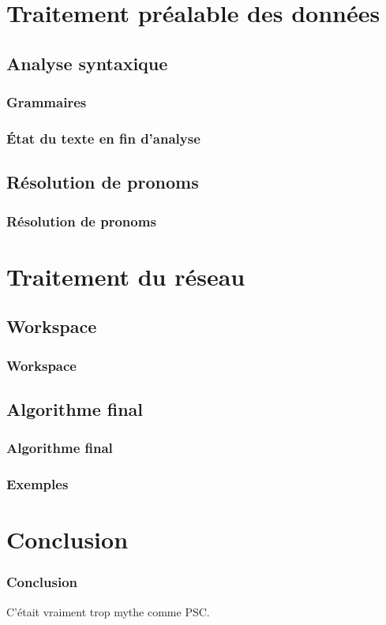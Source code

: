 \documentclass[12pt]{beamer}
\begin{document}
\begin{frame}
 \frametitle{}
 
 
\end{frame}


\section{Traitement préalable des données}

\subsection{Analyse syntaxique}

\begin{frame}
 \frametitle{Grammaires}
 
 
\end{frame}

\begin{frame}
 \frametitle{État du texte en fin d'analyse}
 
 
\end{frame}

\subsection{Résolution de pronoms}

\begin{frame}[allowframebreaks = 0.7]
 \frametitle{Résolution de pronoms}
 
 
\end{frame}

\section{Traitement du réseau}

\subsection{Workspace}

\begin{frame}
 \frametitle{Workspace}
 
 
\end{frame}

\begin{frame}
 \frametitle{}
 
 
\end{frame}

\subsection{Algorithme final}

\begin{frame}
 \frametitle{Algorithme final}
 
 
\end{frame}

\begin{frame}
 \frametitle{Exemples}
 
 
\end{frame}

\section{Conclusion}

\begin{frame}
 \frametitle{Conclusion}
 
C'était vraiment trop mythe comme PSC.
 
\end{frame}
\end{document}
